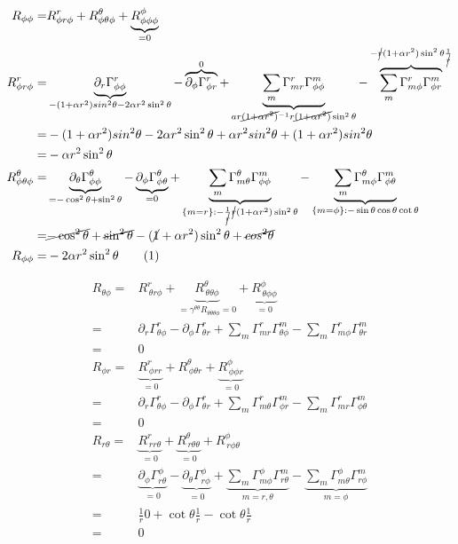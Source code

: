 \documentclass[]{article}
\newcommand\numberthis{\addtocounter{equation}{1}\tag{\theequation}}
\begin{document}
\begin{align*}
R_{\phi\phi}=& R^r_{\phi r \phi} + R^{\theta}_{\phi\theta\phi}+\underbrace{R^{\phi}_{\phi\phi\phi}}_{=0}\\
R^r_{\phi r \phi}=&\underbrace{\partial_r \Gamma^r_{\phi\phi}}_{-(1+\alpha r^2)sin^2 \theta-2\alpha r^2 \sin^2 \theta}-\overbrace{\partial_{\phi}\Gamma^{r}_{\phi r}}^{0} +\underbrace{\sum_m\Gamma^r_{mr}\Gamma^m_{\phi\phi}}_{ar\cancel{(1+\alpha r^2)}^{-1}r\cancel{(1+\alpha r^2)}\sin^2 \theta}-\overbrace{\sum_m\Gamma^r_{m\phi}\Gamma^m_{\phi r}}^{-\cancel{r}(1+\alpha r^2)\sin^2\theta\frac{1}{\cancel{r}}}\\
=&-(1+\alpha r^2)sin^2 \theta-2\alpha r^2 \sin^2 \theta+\alpha r^2 sin^2\theta + (1+\alpha r^2) sin^2\theta\\
=&-\alpha r^2 \sin^2 \theta\\
R^{\theta}_{\phi\theta\phi}=&\underbrace{\partial_\theta\Gamma^{\theta}_{\phi\phi}}_{=-\cos^2\theta+\sin^2\theta}-\underbrace{\partial_{\phi}\Gamma^{\theta}_{\phi\theta}}_{=0} + \underbrace{\sum_m\Gamma^{\theta}_{m\theta}\Gamma^m_{\phi\phi}}_{\{m=r\}: -\frac{1}{\cancel{r}}\cancel{r}(1+\alpha r^2)\sin^2\theta}-\underbrace{\sum_m\Gamma^{\theta}_{m\phi}\Gamma^m_{\phi\theta}}_{\{m=\phi\}:-\sin\theta\cos\theta\cot\theta}\\
=&\cancel{-\cos^2\theta}+\cancel{\sin^2\theta}-(\cancel{1}+\alpha r^2)\sin^2\theta+\cancel{cos^2\theta}\\
R_{\phi\phi}=& -2 \alpha r^2 \sin^2\theta \numberthis\label{eq:R-phi-phi}
\end{align*}

\begin{align*}
R_{\theta\phi}=&R^r_{\,\theta r \phi}+\underbrace{R^{\theta}_{\,\theta\theta\phi}}_{=\gamma^{\theta\theta}R_{\theta\theta\theta\phi}=0}+\underbrace{R^{\phi}_{\,\theta\phi\phi}}_{=0}\\
=&\partial_r\Gamma^r_{\theta\phi}-\partial_{\phi}\Gamma^r_{\theta r}+\sum_m\Gamma^r_{mr}\Gamma^m_{\theta\phi}-\sum_m\Gamma^r_{m\phi}\Gamma^m_{\theta r}\\
=&0\\
R_{\phi r}=&\underbrace{R^r_{\,\phi rr}}_{=0} + R^{\theta}_{\,\phi\theta r} + \underbrace{R^{\phi}_{\,\phi\phi r}}_{=0}\\
=&\partial_r \Gamma^r_{\theta\phi} - \partial_{\phi} \Gamma^r_{\theta r} + \sum_m\Gamma^r_{m\theta} \Gamma^m_{\phi r} - \sum_m\Gamma^r_{mr} \Gamma^m_{\phi \theta} \\
=& 0\\
R_{r\theta}=&\underbrace{R^r_{\,rr \theta}}_{=0} + \underbrace{R^{\theta}_{\,r\theta\theta}}_{=0} + R^{\phi}_{\,r\phi\theta}\\
=&\underbrace{\partial_{\phi} \Gamma^{\phi}_{r\theta}}_{=0} - \underbrace{\partial_{\theta} \Gamma^{\phi}_{r\phi}}_{=0} + \underbrace{\sum_m\Gamma^{\phi}_{m\phi} \Gamma^m_{r\theta}}_{m=r,\theta} - \underbrace{\sum_m\Gamma^{\phi}_{m\theta} \Gamma^m_{r\phi}}_{m=\phi} \\
=&\frac{1}{r}0 + \cot\theta\frac{1}{r}-\cot\theta\frac{1}{r}\\
=&0
\end{align*}
\end{document}
